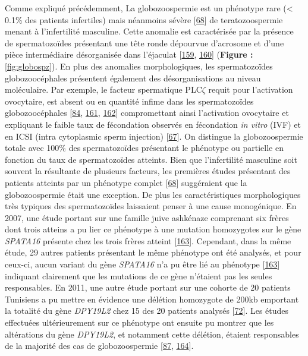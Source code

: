 \documentclass[12pt,twoside]{ugathesis}
\theoremstyle{definition}
\theoremstyle{definition}
\theoremstyle{remark}
\begin{document}
Comme expliqué précédemment, La globozoospermie est un phénotype rare
(\textless{} 0.1\% des patients infertiles) mais néanmoins sévère
{[}\protect\hyperlink{ref-Sen2009}{68}{]} de teratozoospermie menant à
l'infertilité masculine. Cette anomalie est caractérisée par la présence
de spermatozoïdes présentant une tête ronde dépourvue d'acrosome et
d'une pièce intermédiaire désorganisée dans l'éjaculat
{[}\protect\hyperlink{ref-Singh}{159},
\protect\hyperlink{ref-Pedersen1974}{160}{]} (\textbf{Figure :
}\ref{fig:globospz}). En plus des anomalies morphologiques, les
spermatozoïdes globozoocéphales présentent également des
désorganisations au niveau moléculaire. Par exemple, le facteur
spermatique PLC\(\zeta\) requit pour l'activation ovocytaire, est absent
ou en quantité infime dans les spermatozoïdes globozoocéphales
{[}\protect\hyperlink{ref-Heytens2009}{84},
\protect\hyperlink{ref-Taylor2010}{161},
\protect\hyperlink{ref-Yoon2008}{162}{]} compromettant ainsi
l'activation ovocytaire et expliquant le faible taux de fécondation
observés en fécondation \emph{in vitro} (IVF) et en ICSI (intra
cytoplasmic sperm injection) {[}\protect\hyperlink{ref-Dam2006}{67}{]}.
On distingue la globozoospermie totale avec 100\% des spermatozoïdes
présentant le phénotype ou partielle en fonction du taux de
spermatozoïdes atteints. Bien que l'infertilité masculine soit souvent
la résultante de plusieurs facteurs, les premières études présentant des
patients atteints par un phénotype complet
{[}\protect\hyperlink{ref-Sen2009}{68}{]} suggéraient que la
globozoospermie était une exception. De plus les caractéristiques
morphologiques très typiques des spermatozoïdes laissaient penser à une
cause monogénique. En 2007, une étude portant sur une famille juive
ashkénaze comprenant six frères dont trois atteins a pu lier ce
phénotype à une mutation homozygotes sur le gène \emph{SPATA16} présente
chez les trois frères atteint
{[}\protect\hyperlink{ref-Dam2007}{163}{]}. Cependant, dans la même
étude, 29 autres patients présentant le même phénotype ont été analysés,
et pour ceux-ci, aucun variant du gène \emph{SPATA16} n'a pu être lié au
phénotype {[}\protect\hyperlink{ref-Dam2007}{163}{]} indiquant
clairement que les mutations de ce gène n'étaient pas les seules
responsables. En 2011, une autre étude portant sur une cohorte de 20
patients Tunisiens a pu mettre en évidence une délétion homozygote de
200kb emportant la totalité du gène \emph{DPY19L2} chez 15 des 20
patients analysés {[}\protect\hyperlink{ref-Harbuz2011}{72}{]}. Les
études effectuées ultérieurement sur ce phénotype ont ensuite pu montrer
que les altérations du gène \emph{DPY19L2}, et notamment cette délétion,
étaient responsables de la majorité des cas de globozoospermie
{[}\protect\hyperlink{ref-ElInati2012}{87},
\protect\hyperlink{ref-Ray2011}{164}{]}.
\end{document}
